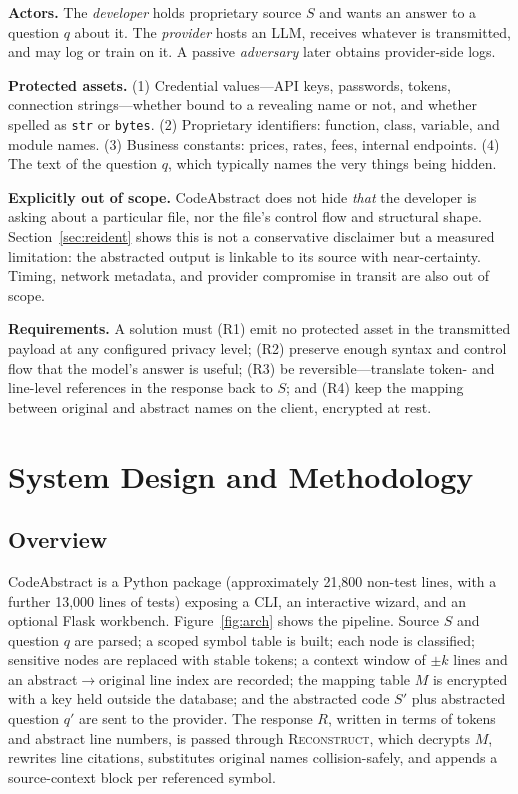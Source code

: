 \documentclass[conference]{IEEEtran}
\begin{document}
\textbf{Actors.} The \emph{developer} holds proprietary source $S$ and
wants an answer to a question $q$ about it. The \emph{provider} hosts an
LLM, receives whatever is transmitted, and may log or train on it. A
passive \emph{adversary} later obtains provider-side logs.

\textbf{Protected assets.} (1) Credential values---API keys, passwords,
tokens, connection strings---whether bound to a revealing name or not, and
whether spelled as \texttt{str} or \texttt{bytes}. (2) Proprietary
identifiers: function, class, variable, and module names. (3) Business
constants: prices, rates, fees, internal endpoints. (4) The text of the
question $q$, which typically names the very things being hidden.

\textbf{Explicitly out of scope.} CodeAbstract does not hide \emph{that}
the developer is asking about a particular file, nor the file's control
flow and structural shape. Section~\ref{sec:reident} shows this is not a
conservative disclaimer but a measured limitation: the abstracted output
is linkable to its source with near-certainty. Timing, network metadata,
and provider compromise in transit are also out of scope.

\textbf{Requirements.} A solution must (R1) emit no protected asset in the
transmitted payload at any configured privacy level; (R2) preserve enough
syntax and control flow that the model's answer is useful; (R3) be
reversible---translate token- and line-level references in the response
back to $S$; and (R4) keep the mapping between original and abstract names
on the client, encrypted at rest.

\section{System Design and Methodology}
\label{sec:method}

\subsection{Overview}

CodeAbstract is a Python package (approximately 21{,}800 non-test lines,
with a further 13{,}000 lines of tests) exposing a CLI, an interactive
wizard, and an optional Flask workbench. Figure~\ref{fig:arch} shows the
pipeline. Source $S$ and question $q$ are parsed; a scoped symbol table is
built; each node is classified; sensitive nodes are replaced with stable
tokens; a context window of $\pm k$ lines and an abstract$\rightarrow$original
line index are recorded; the mapping table $M$ is encrypted with a key
held outside the database; and the abstracted code $S'$ plus abstracted
question $q'$ are sent to the provider. The response $R$, written in terms
of tokens and abstract line numbers, is passed through
\textsc{Reconstruct}, which decrypts $M$, rewrites line citations,
substitutes original names collision-safely, and appends a source-context
block per referenced symbol.
\end{document}
